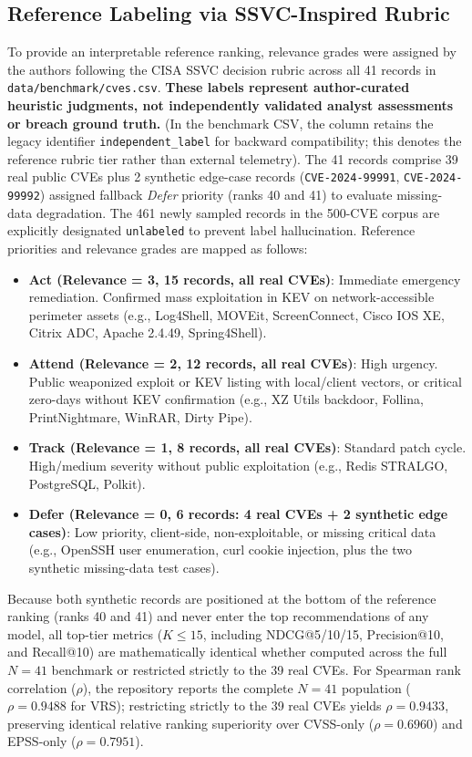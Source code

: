 \documentclass[conference]{IEEEtran}
\begin{document}
\subsection{Reference Labeling via SSVC-Inspired Rubric}
To provide an interpretable reference ranking, relevance grades were assigned by the authors following the CISA SSVC decision rubric \cite{spring2020ssvc} across all 41 records in \texttt{data/benchmark/cves.csv}. \textbf{These labels represent author-curated heuristic judgments, not independently validated analyst assessments or breach ground truth.} (In the benchmark CSV, the column retains the legacy identifier \texttt{independent\_label} for backward compatibility; this denotes the reference rubric tier rather than external telemetry). The 41 records comprise 39 real public CVEs plus 2 synthetic edge-case records (\texttt{CVE-2024-99991}, \texttt{CVE-2024-99992}) assigned fallback \textit{Defer} priority (ranks 40 and 41) to evaluate missing-data degradation. The 461 newly sampled records in the 500-CVE corpus are explicitly designated \texttt{unlabeled} to prevent label hallucination. Reference priorities and relevance grades are mapped as follows:
\begin{itemize}
    \item \textbf{Act (Relevance = 3, 15 records, all real CVEs)}: Immediate emergency remediation. Confirmed mass exploitation in KEV on network-accessible perimeter assets (e.g., Log4Shell, MOVEit, ScreenConnect, Cisco IOS XE, Citrix ADC, Apache 2.4.49, Spring4Shell).
    \item \textbf{Attend (Relevance = 2, 12 records, all real CVEs)}: High urgency. Public weaponized exploit or KEV listing with local/client vectors, or critical zero-days without KEV confirmation (e.g., XZ Utils backdoor, Follina, PrintNightmare, WinRAR, Dirty Pipe).
    \item \textbf{Track (Relevance = 1, 8 records, all real CVEs)}: Standard patch cycle. High/medium severity without public exploitation (e.g., Redis STRALGO, PostgreSQL, Polkit).
    \item \textbf{Defer (Relevance = 0, 6 records: 4 real CVEs + 2 synthetic edge cases)}: Low priority, client-side, non-exploitable, or missing critical data (e.g., OpenSSH user enumeration, curl cookie injection, plus the two synthetic missing-data test cases).
\end{itemize}
Because both synthetic records are positioned at the bottom of the reference ranking (ranks 40 and 41) and never enter the top recommendations of any model, all top-tier metrics ($K \le 15$, including NDCG@5/10/15, Precision@10, and Recall@10) are mathematically identical whether computed across the full $N=41$ benchmark or restricted strictly to the 39 real CVEs. For Spearman rank correlation ($\rho$), the repository reports the complete $N=41$ population ($\rho = 0.9488$ for VRS); restricting strictly to the 39 real CVEs yields $\rho = 0.9433$, preserving identical relative ranking superiority over CVSS-only ($\rho = 0.6960$) and EPSS-only ($\rho = 0.7951$).
\end{document}
